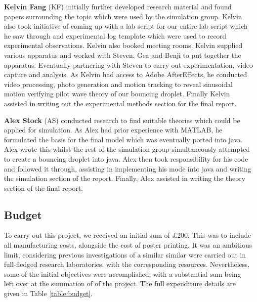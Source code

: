 \textbf{Kelvin Fang} (KF) initially further developed research material and found papers surrounding the topic which were used by the simulation group. Kelvin also took initiative of coming up with a lab script for our entire lab script which he saw through and experimental log template which were used to record experimental observations. Kelvin also booked meeting rooms. Kelvin supplied various apparatus and worked with Steven, Gea and Benji to put together the apparatus. Eventually partnering with Steven to carry out experimentation, video capture and analysis. As Kelvin had access to Adobe AfterEffects, he conducted video processing, photo generation and motion tracking to reveal sinusoidal motion verifying pilot wave theory of our bouncing droplet. Finally Kelvin assisted in writing out the experimental methods section for the final report.

\textbf{Alex Stock} (AS) conducted research to find suitable theories which could be applied for simulation. As Alex had prior experience with MATLAB, he formulated the basis for the final model which was eventually ported into java. Alex wrote this whilst the rest of the simulation group simultaneously attempted to create a bouncing droplet into java. Alex then took responsibility for his code and followed it through, assisting in implementing his mode into java and writing the simulation section of the report. Finally, Alex assisted in writing the theory section of the final report.


\subsection{Budget}
To carry out this project, we received an initial sum of \pounds200. This was to include all manufacturing costs, alongside the cost of poster printing. It was an ambitious limit, considering previous investigations of a similar similar were carried out in full-fledged research laboratories, with the corresponding resources. Nevertheless, some of the initial objectives were accomplished, with a substantial sum being left over at the summation of  of the project. The full expenditure details are given in Table \ref{table:budget}. 

